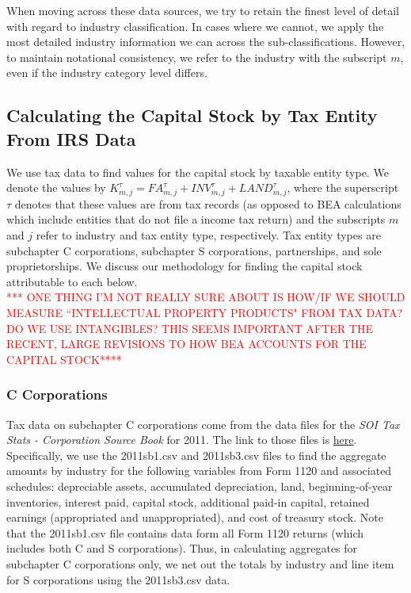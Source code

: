 \documentclass[article,11pt,letterpaper,fleqn]{article}
\theoremstyle{definition}
\numberwithin{equation}{section}
\begin{document}
When moving across these data sources, we try to retain the finest level of detail with regard to industry classification.  In cases where we cannot, we apply the most detailed industry information we can across the sub-classifications.  However, to maintain notational consistency, we refer to the industry with the subscript $m$, even if the industry category level differs.


\subsection{Calculating the Capital Stock by Tax Entity From IRS Data}

We use tax data to find values for the capital stock by taxable entity type.  We denote the values by $K^{\tau}_{m,j}={FA}^{\tau}_{m,j}+{INV}^{\tau}_{m,j}+{LAND}^{\tau}_{m,j}$, where the superscript $\tau$ denotes that these values are from tax records (as opposed to BEA calculations which include entities that do not file a income tax return) and the subscripts $m$ and $j$ refer to industry and tax entity type, respectively.  Tax entity types are subchapter C corporations, subchapter S corporations, partnerships, and sole proprietorships.  We discuss our methodology for finding the capital stock attributable to each below.
\ \\
\textcolor{red}{*** ONE THING I'M NOT REALLY SURE ABOUT IS HOW/IF WE SHOULD MEASURE ``INTELLECTUAL PROPERTY PRODUCTS" FROM TAX DATA?  DO WE USE INTANGIBLES?  THIS SEEMS IMPORTANT AFTER THE RECENT, LARGE REVISIONS TO HOW BEA ACCOUNTS FOR THE CAPITAL STOCK****}


\subsubsection{C Corporations}

Tax data on subchapter C corporations come from the data files for the \emph{SOI Tax Stats - Corporation Source Book} for 2011.  The link to those files is \href{http://www.irs.gov/uac/SOI-Tax-Stats-Corporation-Source-Book:-Data-File}{here}.  Specifically, we use the 2011sb1.csv and 2011sb3.csv files to find the aggregate amounts by industry for the following variables from Form 1120 and associated schedules: depreciable assets, accumulated depreciation, land, beginning-of-year inventories, interest paid, capital stock, additional paid-in capital, retained earnings (appropriated and unappropriated), and cost of treasury stock.  Note that the 2011sb1.csv file contains data form all Form 1120 returns (which includes both C and S corporations).  Thus, in calculating aggregates for subchapter C corporations only, we net out the totals by industry and line item for S corporations using the 2011sb3.csv data.
\end{document}
